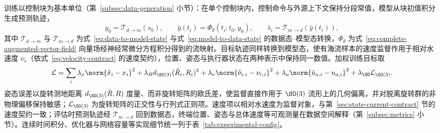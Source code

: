 训练以控制块为基本单位（第~\ref{subsec:data-generation} 小节）：在单个控制块内，控制命令与外源上下文保持分段常值，模型从块初值积分生成预测轨迹，
\begin{equation}
  y_0=\mathcal{T}_{d\to m}(s_0),\qquad
  \hat y(t_i)=\Phi_\theta(t_i;t_0,y_0),\qquad
  \hat s_i=\mathcal{T}_{m\to d}(\hat y(t_i)),
  \label{eq:block-prediction}
\end{equation}
其中 \(\mathcal{T}_{d\to m}\) 与 \(\mathcal{T}_{m\to d}\) 为式~\eqref{eq:data-to-model-state} 与式~\eqref{eq:model-to-data-state} 的数据态--模型态转换，\(\Phi_\theta\) 为式~\eqref{eq:complete-augmented-vector-field} 向量场经神经常微分方程积分得到的流映射。目标轨迹同样转换到模型态，使有海流样本的速度监督作用于相对水速度 \(\nu_r\)（依式~\eqref{eq:velocity-contract} 的速度契约），位置、姿态与执行器状态在两种表示中保持同一数值。加权训练目标取
\begin{equation}
  \mathcal{L}
  =
  \sum_i
  \lambda_x\norm{\hat x_i-x_i}^2
  +\lambda_R d_{\SO(3)}(\hat R_i,R_i)^2
  +\lambda_\nu\norm{\hat\nu_{r,i}-\nu_{r,i}}^2
  +\lambda_a\norm{\hat u_{a,i}-u_{a,i}}^2
  +\lambda_{\SO}\mathcal{L}_{\SO(3)} .
  \label{eq:training-loss}
\end{equation}
姿态误差以旋转测地距离 \(d_{\SO(3)}(\hat R,R)\) 度量、而非旋转矩阵的欧氏差，使监督直接作用于 \(\SO(3)\) 流形上的几何偏离，并对脱离旋转群的非物理偏移保持敏感；\(\mathcal{L}_{\SO(3)}\) 为旋转矩阵的正交性与行列式正则项。速度项以相对水速度为监督对象，与第~\ref{sec:state-current-contract} 节的速度契约一致；评估时预测轨迹经 \(\mathcal{T}_{m\to d}\) 回到数据态，终端位置、姿态与总体速度等可观测量在数据空间解释（第~\ref{subsec:metrics} 小节）。连续时间积分、优化器与网络容量等实现细节统一列于表~\ref{tab:experimental-config}。

